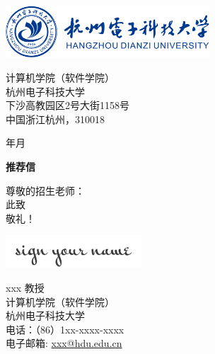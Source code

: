 \documentclass[12pt, a4paper]{letter} %
\renewcommand{\today}{\number\year 年\number\month 月}
\begin{document}
    \begin{minipage}{0.5\textwidth}
        \includegraphics[width=3in]{pic/HDU_Logo.png}\\
    \end{minipage}
    \hfill
    \begin{minipage}{0.6\textwidth}\raggedright
        \small{
            \hphantom{AA}计算机学院（软件学院） \\
            \hphantom{AA}杭州电子科技大学 \\
            \hphantom{AA}下沙高教园区2号大街1158号 \\
            \hphantom{AA}中国浙江杭州，310018 \\
        }
    \end{minipage}

    \vspace{0.4in} %

    \today

    \textbf{推荐信}

    尊敬的招生老师：\\

    
    \hspace*{2em}此致\\
    敬礼！

    \includegraphics[width=2in]{pic/signature.png} %

    xxx 教授 \\ %
    计算机学院（软件学院） \\
    杭州电子科技大学 \\
    电话：（86）1xx-xxxx-xxxx \\ 
    电子邮箱: \href{mailto:xxx@hdu.edu.cn}{xxx@hdu.edu.cn} \\
\end{document}
